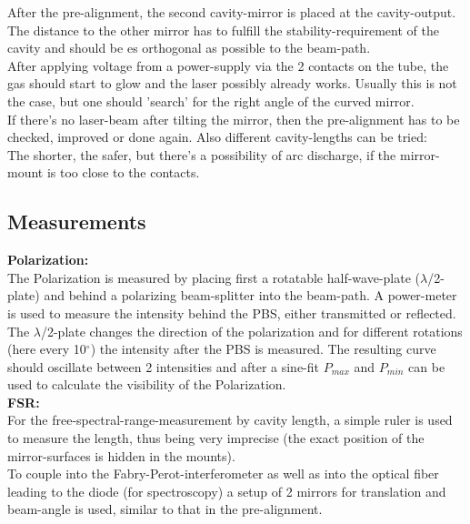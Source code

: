 \documentclass[12pt,a4paper]{article}
\begin{document}
\begin{multicols}{2}
\noindent After the pre-alignment, the second cavity-mirror is placed at the cavity-output. The distance to the other mirror has to fulfill the stability-requirement of the cavity and should be es orthogonal as possible to the beam-path.\\
After applying voltage from a power-supply via the 2 contacts on the tube, the gas should start to glow and the laser possibly already works. Usually this is not the case, but one should 'search' for the right angle of the curved mirror.\\
If there's no laser-beam after tilting the mirror, then the pre-alignment has to be checked, improved or done again. Also different cavity-lengths can be tried:\\
The shorter, the safer, but there's a possibility of arc discharge, if the mirror-mount is too close to the contacts.

\subsection{Measurements}
\textbf{Polarization:}\\
The Polarization is measured by placing first a rotatable half-wave-plate ($\lambda$/2-plate) and behind a polarizing beam-splitter into the beam-path. A power-meter is used to measure the intensity behind the PBS, either transmitted or reflected. The $\lambda$/2-plate changes the direction of the polarization and for different rotations (here every 10$^\circ$) the intensity after the PBS is measured. The resulting curve should oscillate between 2 intensities and after a sine-fit $P_{max}$ and $P_{min}$ can be used to calculate the visibility of the Polarization.\\

\noindent \textbf{FSR:}\\
For the free-spectral-range-measurement by cavity length, a simple ruler is used to measure the length, thus being very imprecise (the exact position of the mirror-surfaces is hidden in the mounts).\\
To couple into the Fabry-Perot-interferometer as well as into the optical fiber leading to the diode (for spectroscopy) a setup of 2 mirrors for translation and beam-angle is used, similar to that in the pre-alignment.\\


\end{multicols}
\end{document}
